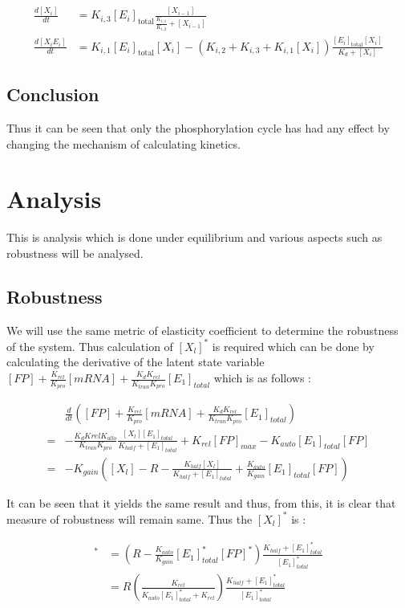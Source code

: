 \begin{align*}
    \frac{d[X_i]}{dt} &= K_{i,3}[E_i]_{\text{total}} \frac{[X_{i-1}]}{\frac{K_{i,1}}{K_{i,2}} + [X_{i-1}]}\\
    \frac{d[X_iE_i]}{dt} &= K_{i,1}[E_i]_{\text{total}}[X_i] - (K_{i,2} + K_{i,3} + K_{i,1}[X_i])\frac{[E_i]_{\text{total}}[X_i]}{K_d + [X_i]}
\end{align*}

\subsection*{Conclusion}
Thus it can be seen that only the phosphorylation cycle has 
had any effect by changing the mechanism of calculating 
kinetics.

\section*{Analysis}
This is analysis which is done under equilibrium and various 
aspects such as robustness will be analysed.

\subsection*{Robustness}
We will use the same metric of elasticity coefficient to 
determine the robustness of the system. Thus calculation 
of $[X_l]^*$ is required which can be done by calculating 
the derivative of the latent state variable 
$[FP] + \frac{K_{rel}}{K_{pro}}[mRNA] + \frac{K_dK_{rel}}{K_{tran}K_{pro}}[E_1]_{total}$ 
which is as follows :

\begin{align*}
    &\frac{d}{dt} ([FP] + \frac{K_{rel}}{K_{pro}}[mRNA] + \frac{K_dK_{rel}}{K_{tran}K_{pro}}[E_1]_{total})\\
    =&-\frac{K_dK{rel}K_{allo}}{K_{tran}K_{pro}} \frac{[X_l][E_1]_{total}}{K_{half}+[E_1]_{total}} + K_{rel}[FP]_{max} - K_{auto}[E_1]_{total}[FP]\\
    =&-K_{gain}([X_l] - R - \frac{K_{half}[X_l]}{K_{half} + [E_1]_{total}} + \frac{K_{auto}}{K_{gain}}[E_1]_{total}[FP])
\end{align*}

It can be seen that it yields the same result and thus, from 
this, it is clear that measure of robustness will remain 
same. Thus the $[X_l]^*$ is :

\begin{align*}
    [X_l]^* &= (R - \frac{K_{auto}}{K_{gain}}[E_1]^*_{total}[FP]^*)\frac{K_{half}+[E_1]^*_{total}}{[E_1]^*_{total}}\\
    &= R(\frac{K_{rel}}{K_{auto}[E_1]^*_{total} + K_{rel}})\frac{K_{half}+[E_1]^*_{total}}{[E_1]^*_{total}}
\end{align*}

